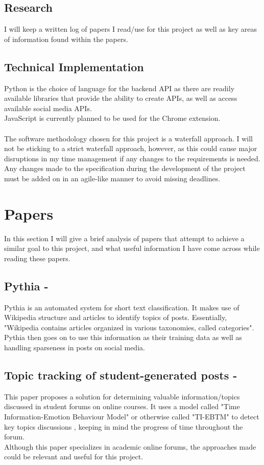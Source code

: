\documentclass[a4paper,fleqn,10pt]{article}
\begin{document}
\subsection{Research}
I will keep a written log of papers I read/use for this project as well as key areas of information found within the papers.\\

\subsection{Technical Implementation}
Python is the choice of language for the backend API as there are readily available libraries that provide the ability to
create APIs, as well as access available social media APIs.\\
JavaScript is currently planned to be used for the Chrome extension.\\\\
The software methodology chosen for this project is a waterfall approach. I will not be sticking to a strict waterfall approach, however,
as this could cause major disruptions in my time management if any changes to the requirements is needed. Any changes made to the
specification during the development of the project must be added on in an agile-like manner to avoid missing deadlines.

\section{Papers}
\label{sec:papers}

In this section I will give a brief analysis of papers that attempt to achieve a similar goal to this project, and what useful
information I have come across while reading these papers.

\subsection{Pythia - \cite{Pythia}}
Pythia is an automated system for short text classification. It makes use of Wikipedia structure and articles to identify
topics of posts.
Essentially, "Wikipedia contains articles organized in various taxonomies, called categories". Pythia then goes on to use
this information as their training data as well as handling sparseness in posts on social media.

\subsection{Topic tracking of student-generated posts - \cite{TopicTracking}}
This paper proposes a solution for determining valuable information/topics discussed in student forums on online courses.
It uses a model called "Time Information-Emotion Behaviour Model" or otherwise called "TI-EBTM" to detect key topics discussions
, keeping in mind the progress of time throughout the forum.\\
Although this paper specializes in academic online forums, the approaches made could be relevant and useful for this project.
\end{document}
